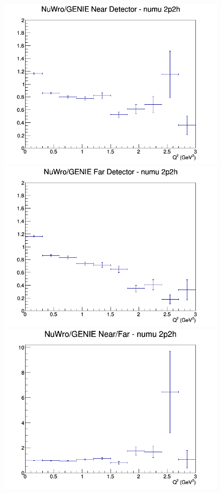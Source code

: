 \begin{figure}[h]
\endminipage
\newline
{}
\includegraphics[width=\linewidth]{eff_Q2/GAr/ratios/2p2h_NuWro_GENIE_numu_near_Q2.png}
\endminipage
{}
\includegraphics[width=\linewidth]{eff_Q2/GAr/ratios/2p2h_NuWro_GENIE_numu_far_Q2.png}
\endminipage
{}
\includegraphics[width=\linewidth]{eff_Q2/GAr/ratios/2p2h_NuWro_GENIE_numu_NF_Q2.png}
\endminipage
\newline
\end{figure}
\clearpage
